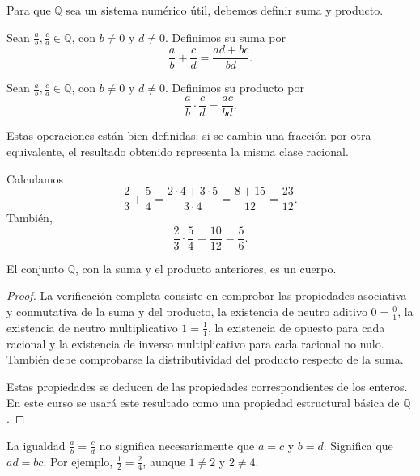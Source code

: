 Para que \(\mathbb{Q}\) sea un sistema numérico útil, debemos definir suma y producto.

\begin{definicion}
Sean \(\frac{a}{b},\frac{c}{d}\in\mathbb{Q}\), con \(b\neq 0\) y \(d\neq 0\). Definimos su suma por
\[
  \frac{a}{b}+\frac{c}{d}
  =
  \frac{ad+bc}{bd}.
\]
\end{definicion}

\begin{definicion}
Sean \(\frac{a}{b},\frac{c}{d}\in\mathbb{Q}\), con \(b\neq 0\) y \(d\neq 0\). Definimos su producto por
\[
  \frac{a}{b}\cdot\frac{c}{d}
  =
  \frac{ac}{bd}.
\]
\end{definicion}

Estas operaciones están bien definidas: si se cambia una fracción por otra equivalente, el resultado obtenido representa la misma clase racional.

\begin{ejemplo}
Calculamos
\[
  \frac{2}{3}+\frac{5}{4}
  =
  \frac{2\cdot 4+3\cdot 5}{3\cdot 4}
  =
  \frac{8+15}{12}
  =
  \frac{23}{12}.
\]
También,
\[
  \frac{2}{3}\cdot\frac{5}{4}
  =
  \frac{10}{12}
  =
  \frac{5}{6}.
\]
\end{ejemplo}

\begin{proposicion}
El conjunto \(\mathbb{Q}\), con la suma y el producto anteriores, es un cuerpo.
\end{proposicion}

\begin{proof}
La verificación completa consiste en comprobar las propiedades asociativa y conmutativa de la suma y del producto, la existencia de neutro aditivo \(0=\frac{0}{1}\), la existencia de neutro multiplicativo \(1=\frac{1}{1}\), la existencia de opuesto para cada racional y la existencia de inverso multiplicativo para cada racional no nulo. También debe comprobarse la distributividad del producto respecto de la suma.

Estas propiedades se deducen de las propiedades correspondientes de los enteros. En este curso se usará este resultado como una propiedad estructural básica de \(\mathbb{Q}\).
\end{proof}

\begin{advertencia}
La igualdad \(\frac{a}{b}=\frac{c}{d}\) no significa necesariamente que \(a=c\) y \(b=d\). Significa que \(ad=bc\). Por ejemplo, \(\frac{1}{2}=\frac{2}{4}\), aunque \(1\neq 2\) y \(2\neq 4\).
\end{advertencia}

